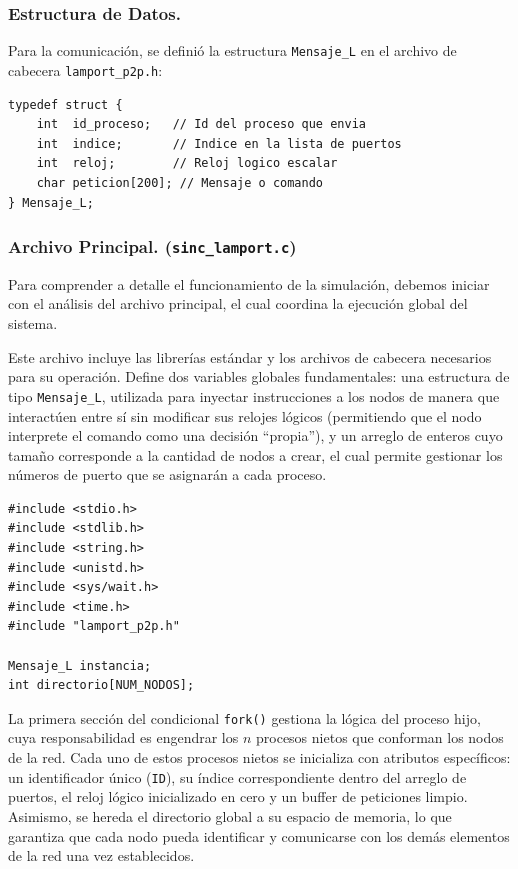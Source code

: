 \subsubsection{Estructura de Datos.}
Para la comunicación, se definió la estructura \texttt{Mensaje\_L} en el archivo de cabecera \texttt{lamport\_p2p.h}:
\begin{lstlisting}[style=estiloC]
typedef struct {
    int  id_proceso;   // Id del proceso que envia
    int  indice;       // Indice en la lista de puertos
    int  reloj;        // Reloj logico escalar
    char peticion[200]; // Mensaje o comando
} Mensaje_L;
\end{lstlisting}

\subsubsection{Archivo Principal. (\texttt{sinc\_lamport.c})}

Para comprender a detalle el funcionamiento de la simulación, debemos iniciar con el análisis del archivo principal, el cual coordina la ejecución global del sistema. 

Este archivo incluye las librerías estándar y los archivos de cabecera necesarios para su operación. Define dos variables globales fundamentales: una estructura de tipo \texttt{Mensaje\_L}, utilizada para inyectar instrucciones a los nodos de manera que interactúen entre sí sin modificar sus relojes lógicos (permitiendo que el nodo interprete el comando como una decisión ``propia''), y un arreglo de enteros cuyo tamaño corresponde a la cantidad de nodos a crear, el cual permite gestionar los números de puerto que se asignarán a cada proceso.

\begin{lstlisting}[style=estiloC]
#include <stdio.h>
#include <stdlib.h>
#include <string.h>
#include <unistd.h>
#include <sys/wait.h>
#include <time.h>
#include "lamport_p2p.h"

Mensaje_L instancia;
int directorio[NUM_NODOS];     
\end{lstlisting}

La primera sección del condicional \texttt{fork()} gestiona la lógica del proceso hijo, cuya responsabilidad es engendrar los $n$ procesos nietos que conforman los nodos de la red. Cada uno de estos procesos nietos se inicializa con atributos específicos: un identificador único (\texttt{ID}), su índice correspondiente dentro del arreglo de puertos, el reloj lógico inicializado en cero y un buffer de peticiones limpio. Asimismo, se hereda el directorio global a su espacio de memoria, lo que garantiza que cada nodo pueda identificar y comunicarse con los demás elementos de la red una vez establecidos.

